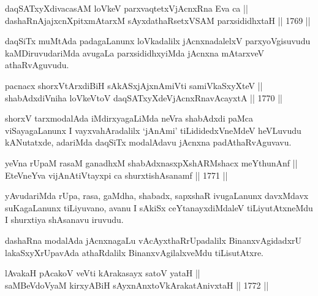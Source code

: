 \begin{shl}
daqSATxyXdivacasAM loVkeV parxvaqtetxVjAcnxRna Eva ca ||  \\
dashaRnAjajxcnXpitxmAtarxM sAyxdathaRsetxVSAM parxsididhxtaH ||  1769 ||  
\end{shl}

\begin{artha}
daqSiTx muMtAda padagaLanunx loVkadalilx jAcnxnadalelxV parxyoVgisuvudu
kaMDiruvudariMda avugaLa parxsididhxyiMda jAcnxna mAtarxveV
athaRvAguvudu.
\end{artha}


\begin{shl}
pacnacx shorxVtArxdiBiH sAkASxjAjxnAmiVti samiVkaSxyXteV || \\
shabAdxdiVniha loVkeV\s toV daqSATxyXdeVjAcnxRnavAcayxtA ||  1770 ||  
\end{shl}

\begin{artha}
shorxV tarxmodalAda iMdirxyagaLiMda neVra shabAdxdi paMca
viSayagaLanunx I vayxvahAradalilx `jAnAmi' tiLididedxVneMdeV
heVLuvudu kANutatxde, adariMda daqSiTx modalAdavu jAcnxna
padAthaRvAguvavu.
\end{artha}


\begin{shl}
yeVna rUpaM rasaM ganadhxM shabAdxnasxpXshARMshacx meYthunAnf || \\
EteVneYva vijAnAtiVtayxpi ca shurxtishAsanamf ||  1771 ||  
\end{shl}

\begin{artha}
yAvudariMda rUpa, rasa, gaMdha, shabadx, sapxshaR ivugaLanunx davxMdavx
suKagaLanunx tiLiyuvano, avanu I sAkiSx ceYtanayxdiMdaleV
tiLiyutAtxneMdu I shurxtiya shAsanavu iruvudu.
\end{artha}

\begin{artha}
dashaRna modalAda jAcnxnagaLu vAcAyxthaRrUpadalilx BinanxvAgidadxrU
lakaSxyXrUpavAda athaRdalilx BinanxvAgilalxveMdu tiLisutAtxre.
\end{artha}

\begin{shl}
lAvakaH pAcakoV veVti kArakasayx satoV yataH || \\
saMBeVdoV\s yaM kirxyABiH sAyxnAnxtoV\s kArakatAnivxtaH ||  1772 ||  
\end{shl}

